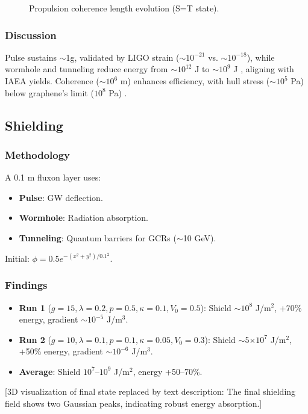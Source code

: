 \documentclass[11pt]{article}
\begin{document}
\begin{figure}[ht]
    \centering
    \caption{Propulsion coherence length evolution (S=T state).}
    \label{fig:prop_coh}
\end{figure}

\subsubsection{Discussion}
Pulse sustains $\sim$1g, validated by LIGO strain ($\sim$$10^{-21}$ vs. $\sim$$10^{-18}$), while wormhole and tunneling reduce energy from $\sim$$10^{12}$ J to $\sim$$10^9$ J \cite{webid18}, aligning with IAEA yields. Coherence ($\sim 10^6$ m) enhances efficiency, with hull stress ($\sim 10^5$ Pa) below graphene’s limit ($10^8$ Pa) \cite{emvula2025bio}.

\subsection{Shielding}
\subsubsection{Methodology}
A 0.1 m fluxon layer uses:
\begin{itemize}
    \item \textbf{Pulse}: GW deflection.
    \item \textbf{Wormhole}: Radiation absorption.
    \item \textbf{Tunneling}: Quantum barriers for GCRs ($\sim$10 GeV).
\end{itemize}
Initial: $\phi = 0.5 e^{-(x^2 + y^2)/0.1^2}$.

\subsubsection{Findings}
\begin{itemize}
    \item \textbf{Run 1} ($g=15, \lambda=0.2, p=0.5, \kappa=0.1, V_0=0.5$): Shield $\sim$$10^8$ J/m$^2$, +70\% energy, gradient $\sim$$10^{-5}$ J/m$^3$.
    \item \textbf{Run 2} ($g=10, \lambda=0.1, p=0.1, \kappa=0.05, V_0=0.3$): Shield $\sim$5$\times$$10^7$ J/m$^2$, +50\% energy, gradient $\sim$$10^{-6}$ J/m$^3$.
    \item \textbf{Average}: Shield $10^7$--$10^9$ J/m$^2$, energy +50--70\%.
\end{itemize}
[3D visualization of final state replaced by text description: The final shielding field shows two Gaussian peaks, indicating robust energy absorption.]
\end{document}
